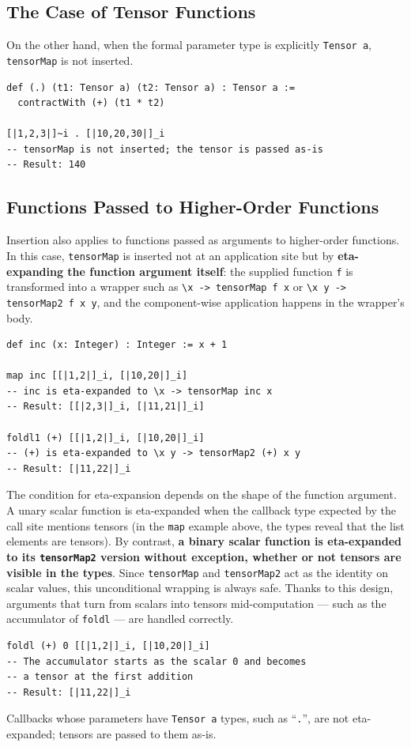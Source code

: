 \subsection{The Case of Tensor Functions}

On the other hand, when the formal parameter type is explicitly \lstinline{Tensor a}, \lstinline{tensorMap} is not inserted.
\begin{lstlisting}[language=egison,numbers=none]
def (.) (t1: Tensor a) (t2: Tensor a) : Tensor a :=
  contractWith (+) (t1 * t2)

[|1,2,3|]~i . [|10,20,30|]_i
-- tensorMap is not inserted; the tensor is passed as-is
-- Result: 140
\end{lstlisting}

\subsection{Functions Passed to Higher-Order Functions}\label{tensor-hof}

Insertion also applies to functions passed as arguments to higher-order functions.
In this case, \lstinline{tensorMap} is inserted not at an application site but by \textbf{eta-expanding the function argument itself}: the supplied function \lstinline{f} is transformed into a wrapper such as \lstinline{\x -> tensorMap f x} or \lstinline{\x y -> tensorMap2 f x y}, and the component-wise application happens in the wrapper's body.
\begin{lstlisting}[language=egison,numbers=none]
def inc (x: Integer) : Integer := x + 1

map inc [[|1,2|]_i, [|10,20|]_i]
-- inc is eta-expanded to \x -> tensorMap inc x
-- Result: [[|2,3|]_i, [|11,21|]_i]

foldl1 (+) [[|1,2|]_i, [|10,20|]_i]
-- (+) is eta-expanded to \x y -> tensorMap2 (+) x y
-- Result: [|11,22|]_i
\end{lstlisting}

The condition for eta-expansion depends on the shape of the function argument.
A unary scalar function is eta-expanded when the callback type expected by the call site mentions tensors (in the \lstinline{map} example above, the types reveal that the list elements are tensors).
By contrast, \textbf{a binary scalar function is eta-expanded to its \lstinline{tensorMap2} version without exception, whether or not tensors are visible in the types}.
Since \lstinline{tensorMap} and \lstinline{tensorMap2} act as the identity on scalar values, this unconditional wrapping is always safe.
Thanks to this design, arguments that turn from scalars into tensors mid-computation --- such as the accumulator of \lstinline{foldl} --- are handled correctly.
\begin{lstlisting}[language=egison,numbers=none]
foldl (+) 0 [[|1,2|]_i, [|10,20|]_i]
-- The accumulator starts as the scalar 0 and becomes
-- a tensor at the first addition
-- Result: [|11,22|]_i
\end{lstlisting}
Callbacks whose parameters have \lstinline{Tensor a} types, such as ``\lstinline{.}'', are not eta-expanded; tensors are passed to them as-is.

